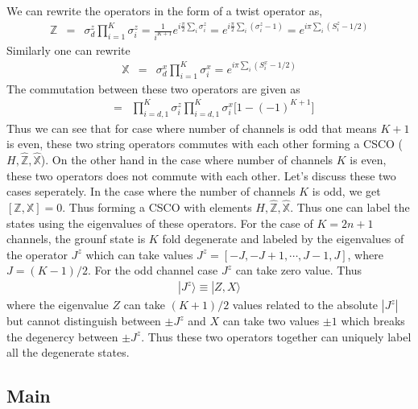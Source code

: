 \documentclass[reprint,prb,superscriptaddress]{revtex4-1}
\begin{document}
We can rewrite the operators in the form of a twist operator as,
\begin{eqnarray}
\mathbb{Z} &=& \sigma_d^z\displaystyle\prod_{i=1}^{K} \sigma_i^z = \frac{1}{i^{K+1}} e^{i\frac{\pi}{2} \sum_{i} \sigma^z_i}=e^{i\frac{\pi}{2} \sum_{i} (\sigma^z_i -1) } =e^{i\pi \sum_{i} (S^z_i -1/2) }
\end{eqnarray}
Similarly one can rewrite
\begin{eqnarray}
\mathbb{X} &=& \sigma_d^x\displaystyle\prod_{i=1}^{K} \sigma_i^x =e^{i\pi \sum_{i} (S^x_i -1/2) }
\end{eqnarray}
The commutation between these two operators are given as
\begin{eqnarray}
[\mathbb{Z},\mathbb{X}] &=& \prod_{i=d,1}^{K} \sigma^z_{i} \prod_{i=d,1}^{K} \sigma^x_{i} \bigg[1-(-1)^{K+1}\bigg]
\end{eqnarray}
Thus we can see that for case where number of channels is odd that means $K+1$ is even, these two string operators commutes with each other forming a CSCO ($H,\hat{\mathbb{Z}},\hat{\mathbb{X}}$). On the other hand in the case where number of channels $K$ is even, these two operators does not commute with each other. Let's discuss these two cases seperately.
In the case where the number of channels $K$ is odd, we get $[\mathbb{Z},\mathbb{X}]=0$. Thus forming a CSCO with elements $H,\hat{\mathbb{Z}},\hat{\mathbb{X}}$. Thus one can label the states using the eigenvalues of these operators. For the case of $K=2n+1$ channels, the grounf state is $K$ fold degenerate and labeled by the eigenvalues of the operator $J^z$ which can take values $J^z=[-J,-J+1,\cdots, J-1, J]$, where $J=(K-1)/2$. For the odd channel case $J^z$ can take zero value. Thus 
\begin{eqnarray}
|J^z\rangle \equiv |Z,X \rangle
\end{eqnarray}
where the eigenvalue $Z$ can take $(K+1)/2$ values related to the absolute $|J^z|$ but cannot distinguish between $\pm J^z$ and $X$ can take two values $\pm 1$ which breaks the degenercy between $\pm J^z$. Thus these two operators together can uniquely label all the degenerate states.

\subsection{Main}
\end{document}
